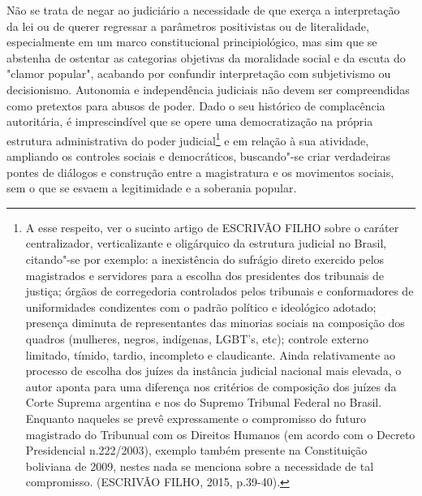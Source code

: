 Não se trata de negar ao judiciário a necessidade de que exerça a
interpretação da lei ou de querer regressar a parâmetros positivistas ou
de literalidade, especialmente em um marco constitucional
principiológico, mas sim que se abstenha de ostentar as categorias
objetivas da moralidade social e da escuta do "clamor popular", acabando
por confundir interpretação com subjetivismo ou decisionismo. Autonomia
e independência judiciais não devem ser compreendidas como pretextos
para abusos de poder. Dado o seu histórico de complacência autoritária,
é imprescindível que se opere uma democratização na própria estrutura
administrativa do poder judicial\footnote{A esse respeito, ver o sucinto
  artigo de ESCRIVÃO FILHO sobre o caráter centralizador, verticalizante
  e oligárquico da estrutura judicial no Brasil, citando"-se por exemplo:
  a inexistência do sufrágio direto exercido pelos magistrados e
  servidores para a escolha dos presidentes dos tribunais de justiça;
  órgãos de corregedoria controlados pelos tribunais e conformadores de
  uniformidades condizentes com o padrão político e ideológico adotado;
  presença diminuta de representantes das minorias sociais na composição
  dos quadros (mulheres, negros, indígenas, LGBT's, etc); controle
  externo limitado, tímido, tardio, incompleto e claudicante. Ainda
  relativamente ao processo de escolha dos juízes da instância judicial
  nacional mais elevada, o autor aponta para uma diferença nos critérios
  de composição dos juízes da Corte Suprema argentina e nos do Supremo
  Tribunal Federal no Brasil. Enquanto naqueles se prevê expressamente o
  compromisso do futuro magistrado do Tribunual com os Direitos Humanos
  (em acordo com o Decreto Presidencial n.222/2003), exemplo também
  presente na Constituição boliviana de 2009, nestes nada se menciona
  sobre a necessidade de tal compromisso. (ESCRIVÃO FILHO, 2015,
  p.39-40).} e em relação à sua atividade, ampliando os controles
sociais e democráticos, buscando"-se criar verdadeiras pontes de diálogos
e construção entre a magistratura e os movimentos sociais, sem o que se
esvaem a legitimidade e a soberania popular.

